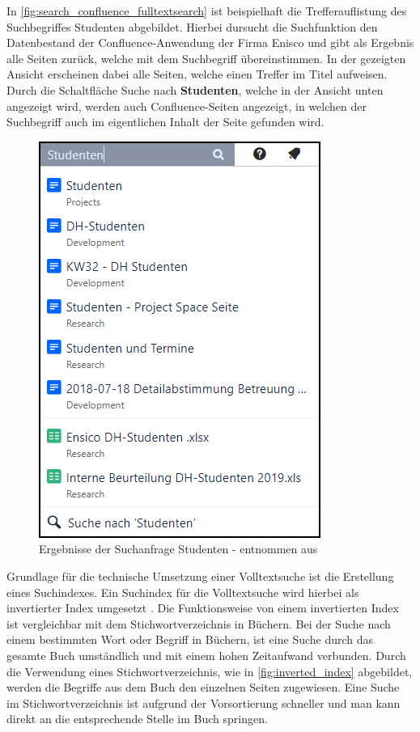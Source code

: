 In \autoref{fig:search_confluence_fulltextsearch} ist beispielhaft die Trefferauflistung des Suchbegriffes \glqq Studenten\grqq{} abgebildet. Hierbei dursucht die Suchfunktion den Datenbestand der Confluence-Anwendung der Firma Enisco und gibt als Ergebnis alle Seiten zurück, welche mit dem Suchbegriff übereinstimmen. In der gezeigten Ansicht erscheinen dabei alle Seiten, welche einen Treffer im Titel aufweisen. Durch die Schaltfläche \glqq Suche nach \textbf{Studenten}\grqq{}, welche in der Ansicht unten angezeigt wird, werden auch Confluence-Seiten angezeigt, in welchen der Suchbegriff auch im eigentlichen Inhalt der Seite gefunden wird.

\begin{figure}[H]
    \centering
    \includegraphics[width=0.4\linewidth]{images/Suchleiste_Confluence.png}
    \caption{Ergebnisse der Suchanfrage \glqq Studenten\grqq{} - entnommen aus \cite{EniscobyForcamGmbH.2021}\protect\footnotemark}
    \label{fig:search_confluence_fulltextsearch}
\end{figure}


Grundlage für die technische Umsetzung einer Volltextsuche ist die Erstellung eines Suchindexes. Ein Suchindex für die Volltextsuche wird hierbei als invertierter Index umgesetzt \cite{SebastianRuss.2017}. Die Funktionsweise von einem invertierten Index ist vergleichbar mit dem Stichwortverzeichnis in Büchern. Bei der Suche nach einem bestimmten Wort oder Begriff in Büchern, ist eine Suche durch das gesamte Buch umständlich und mit einem hohen Zeitaufwand verbunden. Durch die Verwendung eines Stichwortverzeichnis, wie in \autoref{fig:inverted_index} abgebildet, werden die Begriffe aus dem Buch den einzelnen Seiten zugewiesen. Eine Suche im Stichwortverzeichnis ist aufgrund der Vorsortierung schneller und man kann direkt an die entsprechende Stelle im Buch springen.

